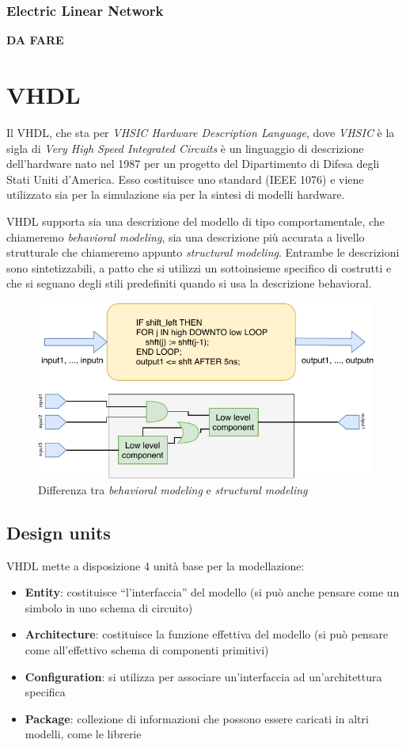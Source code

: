 \documentclass[10pt,a4paper,oneside]{scrbook}
\begin{document}
\subsection{Electric Linear Network}
\textbf{DA FARE}
\chapter{VHDL}
Il VHDL, che sta per \textit{VHSIC Hardware Description Language}, dove \textit{VHSIC} è la sigla di \textit{Very High Speed Integrated Circuits} 
è un linguaggio di descrizione dell'hardware nato nel 1987 per un progetto del Dipartimento di Difesa degli Stati Uniti d'America.
Esso costituisce uno standard (IEEE 1076) e viene utilizzato sia per la simulazione sia per la sintesi di modelli hardware.

VHDL supporta sia una descrizione del modello di tipo comportamentale, che chiameremo \textit{behavioral modeling}, sia una descrizione più accurata
a livello strutturale che chiameremo appunto \textit{structural modeling}. Entrambe le descrizioni sono sintetizzabili, a patto che si utilizzi un
sottoinsieme specifico di costrutti e che si seguano degli stili predefiniti quando si usa la descrizione behavioral.
\begin{figure}[h]
    \centering
    \includegraphics[width=1\linewidth]{"img/vhdl modeling"}
    \caption{Differenza tra \textit{behavioral modeling} e \textit{structural modeling}}
    \label{fig:vhdl_modeling}
\end{figure}

\section{Design units}
VHDL mette a disposizione 4 unità base per la modellazione:
\begin{itemize}
    \item \textbf{Entity}: costituisce ``l'interfaccia'' del modello (si può 
    anche pensare come un simbolo in uno schema di circuito)
    \item \textbf{Architecture}: costituisce la funzione effettiva del modello 
    (si può pensare come all'effettivo schema di componenti primitivi)
    \item \textbf{Configuration}: si utilizza per associare un'interfaccia ad un'architettura specifica
    \item \textbf{Package}: collezione di informazioni che possono essere caricati in altri modelli, come le librerie
\end{itemize}
\end{document}

